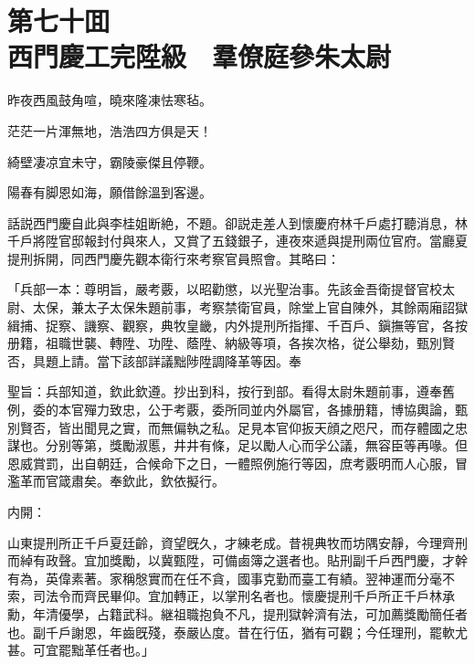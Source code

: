 
\chapter*{第七十囬　\\西門慶工完陞級　羣僚庭參朱太尉}


\begin{myquote}
昨夜西風鼓角喧，曉來隆凍怯寒毡。

茫茫一片渾無地，浩浩四方俱是天！

綺壁凄凉宜未守，霸陵豪傑且停鞭。

陽春有脚恩如海，願借餘溫到客邊。
\end{myquote}

話説西門慶自此與李桂姐断絶，不題。卻説走差人到懷慶府林千戶處打聽消息，林千戶將陞官邸報封付與來人，又賞了五錢銀子，連夜來遞與提刑兩位官府。當廳夏提刑拆開，同西門慶先觀本衛行來考察官員照會。其略曰：

\begin{myquote}[\markfont]
「兵部一本：尊明旨，嚴考覈，以昭勸懲，以光聖治事。先該金吾衛提督官校太尉、太保，兼太子太保朱題前事，考察禁衛官員，除堂上官自陳外，其餘兩廂詔獄緝捕、捉察、譏察、觀察，典牧皇畿，内外提刑所指揮、千百戶、鎭撫等官，各按册籍，祖職世襲、轉陞、功陞、蔭陞、納級等項，各挨次格，従公舉劾，甄別賢否，具題上請。當下該部詳議黜陟陞調降革等因。奉

聖旨：兵部知道，欽此欽遵。抄出到科，按行到部。看得太尉朱題前事，遵奉舊例，委的本官殫力致忠，公于考覈，委所同並内外屬官，各據册籍，博協輿論，甄別賢否，皆出聞見之實，而無偏執之私。足見本官仰扳天顔之咫尺，而存體國之忠謀也。分别等第，獎勵淑慝，井井有條，足以勵人心而孚公議，無容臣等再喙。但恩威賞罰，出自朝廷，合候命下之日，一體照例施行等因，庶考覈明而人心服，冒濫革而官箴肅矣。奉欽此，欽依擬行。

内開：

山東提刑所正千戶夏廷齡，資望旣久，才練老成。昔視典牧而坊隅安靜，今理齊刑而綽有政聲。宜加獎勵，以冀甄陞，可備鹵簿之選者也。貼刑副千戶西門慶，才幹有為，英偉素著。家稱慇實而在任不貪，國事克勤而臺工有績。翌神運而分毫不索，司法令而齊民畢仰。宜加轉正，以掌刑名者也。懷慶提刑千戶所正千戶林承勳，年清優學，占籍武科。継祖職抱負不凡，提刑獄幹濟有法，可加薦獎勵簡任者也。副千戶謝恩，年齒旣殘，泰嚴亾度。昔在行伍，猶有可觀；今任理刑，罷軟尤甚。可宜罷黜革任者也。」
\end{myquote}

